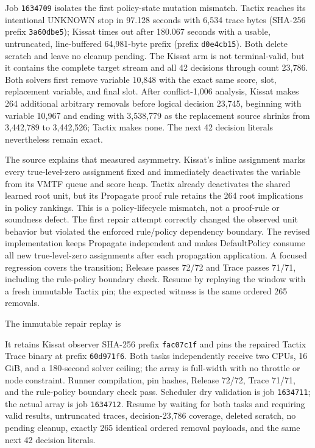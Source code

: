 \documentclass[11pt]{article}
\newcommand{\code}[1]{\texttt{#1}}
\newcommand{\artifact}[1]{\path{#1}}
\begin{document}
Job \code{1634709} isolates the first policy-state mutation mismatch. Tactix
reaches its intentional UNKNOWN stop in 97.128 seconds with 6,534 trace bytes
(SHA-256 prefix \code{3a60dbe5}); Kissat times out after 180.067 seconds with
a usable, untruncated, line-buffered 64,981-byte prefix (prefix
\code{d0e4cb15}). Both delete scratch and leave no cleanup pending. The Kissat
arm is not terminal-valid, but it contains the complete target stream and all
42 decisions through count 23,786. Both solvers first remove variable 10,848
with the exact same score, slot, replacement variable, and final slot. After
conflict-1,006 analysis, Kissat makes 264 additional arbitrary removals before
logical decision 23,745, beginning with variable 10,967 and ending with
3,538,779 as the replacement source shrinks from 3,442,789 to 3,442,526;
Tactix makes none. The next 42 decision literals nevertheless remain exact.

The source explains that measured asymmetry. Kissat's inline assignment marks
every true-level-zero assignment fixed and immediately deactivates the variable
from its VMTF queue and score heap. Tactix already deactivates the shared
learned root unit, but its Propagate proof rule retains the 264 root implications
in policy rankings. This is a policy-lifecycle mismatch, not a proof-rule or
soundness defect. The first repair attempt correctly changed the observed unit
behavior but violated the enforced rule/policy dependency boundary. The revised
implementation keeps Propagate independent and makes DefaultPolicy consume all
new true-level-zero assignments after each propagation application. A focused
regression covers the transition; Release passes 72/72 and Trace passes 71/71,
including the rule-policy boundary check. Resume by replaying the window with a
fresh immutable Tactix pin; the expected witness is the same ordered 265
removals.

The immutable repair replay is
\begin{center}\small\artifact{20260819-1445-tierd-rank22-root-fixed-replay}\end{center}
It retains Kissat observer SHA-256 prefix \code{fac07c1f} and pins the repaired
Tactix Trace binary at prefix \code{60d971f6}. Both tasks independently receive
two CPUs, 16\,GiB, and a 180-second solver ceiling; the array is full-width with
no throttle or node constraint. Runner compilation, pin hashes, Release 72/72,
Trace 71/71, and the rule-policy boundary check pass. Scheduler dry validation
is job \code{1634711}; the actual array is job \code{1634712}. Resume by waiting
for both tasks and requiring valid results, untruncated traces, decision-23,786
coverage, deleted scratch, no pending cleanup, exactly 265 identical ordered
removal payloads, and the same next 42 decision literals.
\end{document}
